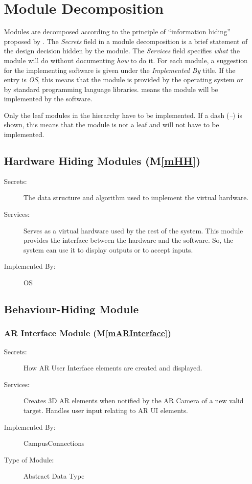 \documentclass[12pt, titlepage]{article}
\newcommand{\mref}[1]{M\ref{#1}}
\begin{document}
\section{Module Decomposition} \label{SecMD}

Modules are decomposed according to the principle of ``information hiding''
proposed by \citet{ParnasEtAl1984}. The \emph{Secrets} field in a module
decomposition is a brief statement of the design decision hidden by the
module. The \emph{Services} field specifies \emph{what} the module will do
without documenting \emph{how} to do it. For each module, a suggestion for the
implementing software is given under the \emph{Implemented By} title. If the
entry is \emph{OS}, this means that the module is provided by the operating
system or by standard programming language libraries.  \emph{\progname{}} means the
module will be implemented by the \progname{} software.

Only the leaf modules in the hierarchy have to be implemented. If a dash
(\emph{--}) is shown, this means that the module is not a leaf and will not have
to be implemented.

\subsection{Hardware Hiding Modules (\mref{mHH})}

\begin{description}
\item[Secrets:]The data structure and algorithm used to implement the virtual
  hardware.
\item[Services:]Serves as a virtual hardware used by the rest of the
  system. This module provides the interface between the hardware and the
  software. So, the system can use it to display outputs or to accept inputs.
\item[Implemented By:] OS
\end{description}

\subsection{Behaviour-Hiding Module}
\subsubsection{AR Interface Module (\mref{mARInterface})}
\begin{description}
\item[Secrets:]How AR User Interface elements are created and displayed.
\item[Services:]Creates 3D AR elements when notified by the AR Camera of a new valid target. Handles user input relating to AR UI elements.
\item[Implemented By:] CampusConnections
\item[Type of Module:] Abstract Data Type
\end{description}
\end{document}
